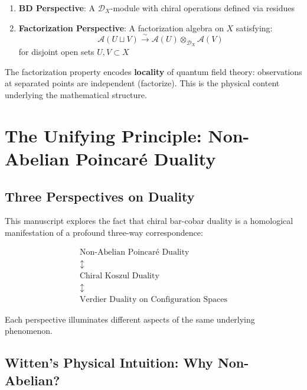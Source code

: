 \begin{enumerate}
\item \textbf{BD Perspective}: A $\mathcal{D}_X$-module with chiral operations defined via residues
\item \textbf{Factorization Perspective}: A factorization algebra on $X$ satisfying:
\begin{equation}
\mathcal{A}(U \sqcup V) \xrightarrow{\sim} \mathcal{A}(U) \otimes_{\mathcal{D}_X} \mathcal{A}(V)
\end{equation}
for disjoint open sets $U, V \subset X$
\end{enumerate}

\begin{remark}
The factorization property encodes \textbf{locality} of quantum field theory: observations at separated points are independent (factorize). This is the physical content underlying the mathematical structure.
\end{remark}

\section{The Unifying Principle: Non-Abelian Poincaré Duality}
\label{sec:NAP-unifying}

\subsection{Three Perspectives on Duality}

\begin{framework}\label{framework:three-way}
This manuscript explores the fact that chiral bar-cobar duality is a homological manifestation of a profound three-way correspondence:

$$\boxed{
\begin{array}{c}
\text{Non-Abelian Poincaré Duality} \\
\updownarrow \\
\text{Chiral Koszul Duality} \\
\updownarrow \\
\text{Verdier Duality on Configuration Spaces}
\end{array}
}$$

Each perspective illuminates different aspects of the same underlying phenomenon.
\end{framework}

\subsection{Witten's Physical Intuition: Why Non-Abelian?}

